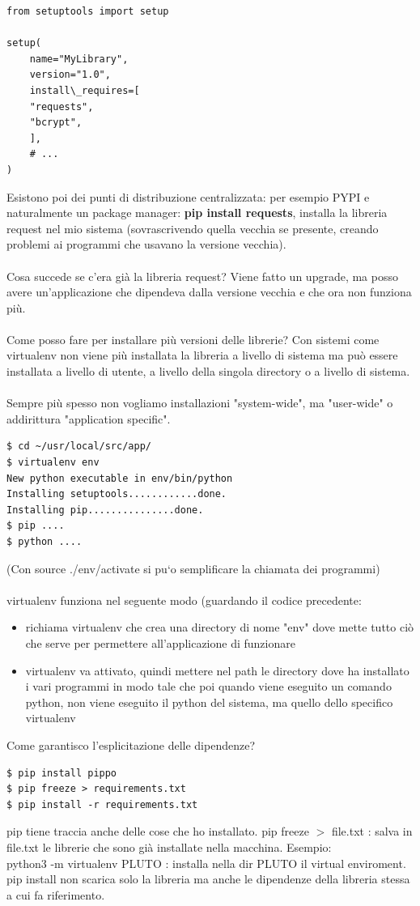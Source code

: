 \begin{verbatim}
from setuptools import setup

setup(
    name="MyLibrary",
    version="1.0",
    install\_requires=[
    "requests",
    "bcrypt",
    ],
    # ...
)
\end{verbatim}
Esistono poi dei punti di distribuzione centralizzata: per esempio PYPI e naturalmente un package manager: 
\textbf{pip install requests}, installa la libreria request nel mio sistema (sovrascrivendo quella vecchia se presente, creando problemi ai programmi che usavano la versione vecchia).
\\\\ Cosa succede se c'era già la libreria request? Viene fatto un upgrade, ma posso avere un'applicazione che dipendeva dalla versione vecchia e che ora non funziona più.
\\\\ Come posso fare per installare più versioni delle librerie?
Con sistemi come virtualenv non viene più installata la libreria a livello di sistema ma può essere installata a livello di utente, a livello della singola directory o a livello di sistema. 
\\\\ Sempre più spesso non vogliamo installazioni "system-wide", ma "user-wide" o addirittura "application specific".
\begin{verbatim}
$ cd ~/usr/local/src/app/
$ virtualenv env
New python executable in env/bin/python
Installing setuptools............done.
Installing pip...............done.
$ pip ....
$ python ....
\end{verbatim} 
(Con source ./env/activate si pu`o semplificare la chiamata dei programmi)
\\\\ virtualenv funziona nel seguente modo (guardando il codice precedente: 
\begin{itemize}
    \item richiama virtualenv che crea una directory di nome "env" dove mette tutto ciò che serve per permettere all'applicazione di funzionare
    \item virtualenv va attivato, quindi mettere nel path le directory dove ha installato i vari programmi in modo tale che poi quando viene eseguito un comando python, non viene eseguito il python del sistema, ma quello dello specifico virtualenv
\end{itemize}
Come garantisco l'esplicitazione delle dipendenze?
\begin{verbatim}
$ pip install pippo
$ pip freeze > requirements.txt
$ pip install -r requirements.txt
\end{verbatim} 
pip tiene traccia anche delle cose che ho installato.
pip freeze $>$ file.txt : salva in file.txt le librerie che sono già installate nella macchina.
Esempio: 
\\ python3 -m virtualenv PLUTO : installa nella dir PLUTO il virtual enviroment. 
\\ pip install non scarica solo la libreria ma anche le dipendenze della libreria stessa a cui fa riferimento.

